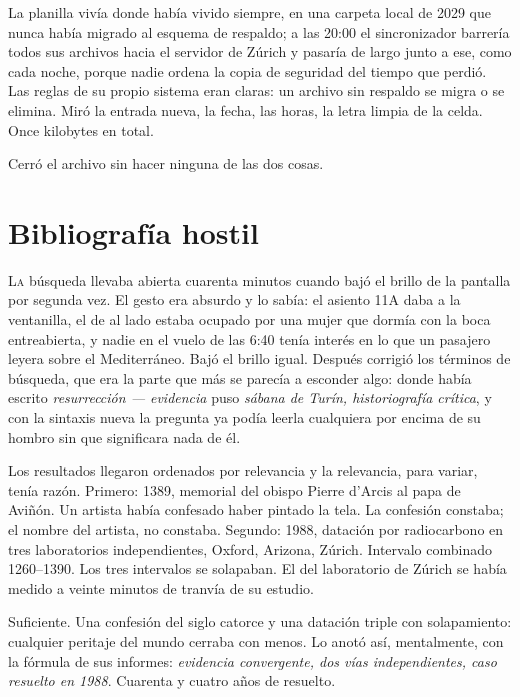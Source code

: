 La planilla vivía donde había vivido siempre, en una carpeta local de 2029 que nunca había migrado al esquema de respaldo; a las 20:00 el sincronizador barrería todos sus archivos hacia el servidor de Zúrich y pasaría de largo junto a ese, como cada noche, porque nadie ordena la copia de seguridad del tiempo que perdió. Las reglas de su propio sistema eran claras: un archivo sin respaldo se migra o se elimina. Miró la entrada nueva, la fecha, las horas, la letra limpia de la celda. Once kilobytes en total.

Cerró el archivo sin hacer ninguna de las dos cosas.

\clearpage

\chapter{Bibliografía hostil}

\lettrine[lines=2, lhang=0.1, nindent=0.2em]{L}{a} búsqueda llevaba abierta cuarenta minutos cuando bajó el brillo de la pantalla por segunda vez. El gesto era absurdo y lo sabía: el asiento 11A daba a la ventanilla, el de al lado estaba ocupado por una mujer que dormía con la boca entreabierta, y nadie en el vuelo de las 6:40 tenía interés en lo que un pasajero leyera sobre el Mediterráneo. Bajó el brillo igual. Después corrigió los términos de búsqueda, que era la parte que más se parecía a esconder algo: donde había escrito \textit{resurrección --- evidencia} puso \textit{sábana de Turín, historiografía crítica}, y con la sintaxis nueva la pregunta ya podía leerla cualquiera por encima de su hombro sin que significara nada de él.


Los resultados llegaron ordenados por relevancia y la relevancia, para variar, tenía razón. Primero: 1389, memorial del obispo Pierre d'Arcis al papa de Aviñón. Un artista había confesado haber pintado la tela. La confesión constaba; el nombre del artista, no constaba. Segundo: 1988, datación por radiocarbono en tres laboratorios independientes, Oxford, Arizona, Zúrich. Intervalo combinado 1260--1390. Los tres intervalos se solapaban. El del laboratorio de Zúrich se había medido a veinte minutos de tranvía de su estudio.

Suficiente. Una confesión del siglo catorce y una datación triple con solapamiento: cualquier peritaje del mundo cerraba con menos. Lo anotó así, mentalmente, con la fórmula de sus informes: \textit{evidencia convergente, dos vías independientes, caso resuelto en 1988}. Cuarenta y cuatro años de resuelto.

